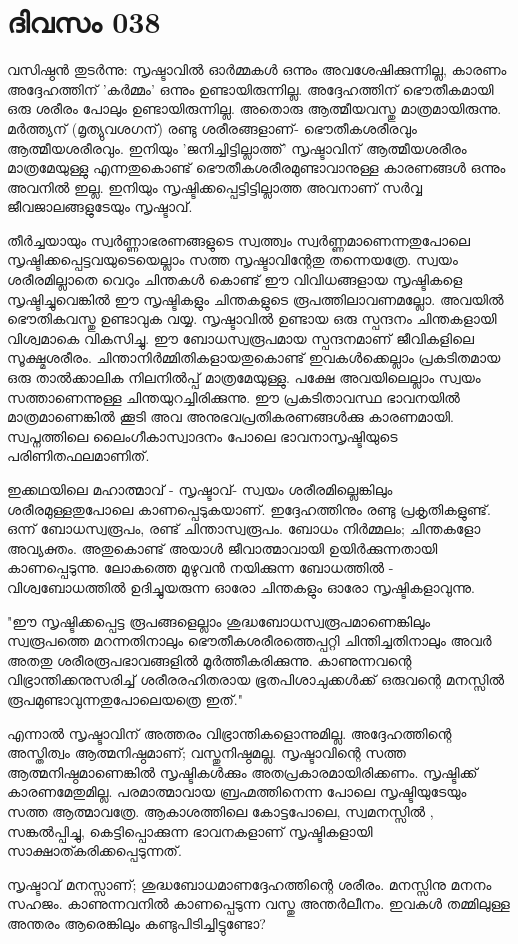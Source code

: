 \newpage
\section{ദിവസം 038}


വസിഷ്ഠന്‍ തുടര്‍ന്നു: സൃഷ്ടാവില്‍ ഓര്‍മ്മകള്‍ ഒന്നും അവശേഷിക്കുന്നില്ല, കാരണം അദ്ദേഹത്തിന്‌ 'കര്‍മ്മം' ഒന്നും ഉണ്ടായിരുന്നില്ല. അദ്ദേഹത്തിന്‌ ഭൌതീകമായി ഒരു ശരീരം പോലും ഉണ്ടായിരുന്നില്ല. അതൊരു ആത്മീയവസ്തു മാത്രമായിരുന്നു. മര്‍ത്ത്യന്‌ (മൃത്യുവശഗന്‌) രണ്ടു ശരീരങ്ങളാണ്‌- ഭൌതീകശരീരവും ആത്മീയശരീരവും. ഇനിയും 'ജനിച്ചിട്ടില്ലാത്ത്‌' സൃഷ്ടാവിന്‌ ആത്മീയശരീരം മാത്രമേയുള്ളു എന്നതുകൊണ്ട്‌ ഭൌതീകശരീരമുണ്ടാവാനുള്ള കാരണങ്ങള്‍ ഒന്നും അവനില്‍ ഇല്ല. ഇനിയും സൃഷ്ടിക്കപ്പെട്ടിട്ടില്ലാത്ത അവനാണ്‌ സര്‍വ്വ ജീവജാലങ്ങളുടേയും സൃഷ്ടാവ്‌. 

തീര്‍ച്ചയായും സ്വര്‍ണ്ണാഭരണങ്ങളുടെ സ്വത്ത്വം സ്വര്‍ണ്ണമാണെന്നതുപോലെ സൃഷ്ടിക്കപ്പെട്ടവയുടെയെല്ലാം സത്ത സൃഷ്ടാവിന്റേതു തന്നെയത്രേ. സ്വയം ശരീരമില്ലാതെ വെറും ചിന്തകള്‍ കൊണ്ട്‌ ഈ വിവിധങ്ങളായ സൃഷ്ടികളെ സൃഷ്ടിച്ചുവെങ്കില്‍ ഈ സൃഷ്ടികളും ചിന്തകളുടെ രൂപത്തിലാവണമല്ലോ. അവയില്‍ ഭൌതികവസ്തു ഉണ്ടാവുക വയ്യ. സൃഷ്ടാവില്‍ ഉണ്ടായ ഒരു സ്പന്ദനം ചിന്തകളായി വിശ്വമാകെ വികസിച്ചു. ഈ ബോധസ്വരൂപമായ സ്പന്ദനമാണ്‌ ജീവികളിലെ സൂക്ഷ്മശരീരം. ചിന്താനിര്‍മ്മിതികളായതുകൊണ്ട്‌ ഇവകള്‍ക്കെല്ലാം പ്രകടിതമായ ഒരു  താല്‍ക്കാലിക നിലനില്‍പ്പ്‌ മാത്രമേയുള്ളു. പക്ഷേ അവയിലെല്ലാം സ്വയം സത്താണെന്നുള്ള ചിന്തയുറച്ചിരിക്കുന്നു. ഈ പ്രകടിതാവസ്ഥ ഭാവനയില്‍ മാത്രമാണെങ്കില്‍ ക്കൂടി അവ അനുഭവപ്രതികരണങ്ങള്‍ക്കു കാരണമായി. സ്വപ്നത്തിലെ ലൈംഗീകാസ്വാദനം പോലെ ഭാവനാസൃഷ്ടിയുടെ പരിണിതഫലമാണിത്‌.

ഇക്കഥയിലെ മഹാത്മാവ്‌ - സൃഷ്ടാവ്‌- സ്വയം ശരീരമില്ലെങ്കിലും ശരീരമുള്ളതുപോലെ കാണപ്പെടുകയാണ്‌. ഇദ്ദേഹത്തിനും രണ്ടു പ്രകൃതികളുണ്ട്‌. ഒന്ന് ബോധസ്വരൂപം, രണ്ട്‌ ചിന്താസ്വരൂപം. ബോധം നിര്‍മ്മലം; ചിന്തകളോ അവ്യക്തം. അതുകൊണ്ട്‌ അയാള്‍ ജീവാത്മാവായി ഉയിര്‍ക്കുന്നതായി കാണപ്പെടുന്നു. ലോകത്തെ മുഴുവന്‍ നയിക്കുന്ന ബോധത്തില്‍ - വിശ്വബോധത്തില്‍ ഉദിച്ചുയരുന്ന ഓരോ ചിന്തകളും ഓരോ സൃഷ്ടികളാവുന്നു.

"ഈ സൃഷ്ടിക്കപ്പെട്ട രൂപങ്ങളെല്ലാം ശുദ്ധബോധസ്വരൂപമാണെങ്കിലും സ്വരൂപത്തെ മറന്നതിനാലും ഭൌതീകശരീരത്തെപ്പറ്റി ചിന്തിച്ചതിനാലും അവര്‍ അതതു ശരീരരൂപഭാവങ്ങളില്‍ മൂര്‍ത്തീകരിക്കുന്നു. കാണുന്നവന്റെ വിഭ്രാന്തിക്കനുസരിച്ച്‌ ശരീരരഹിതരായ ഭൂതപിശാചുക്കള്‍ക്ക്‌ ഒരുവന്റെ മനസ്സില്‍ രൂപമുണ്ടാവുന്നതുപോലെയത്രെ ഇത്‌."

എന്നാല്‍ സൃഷ്ടാവിന്‌ അത്തരം വിഭ്രാന്തികളൊന്നുമില്ല. അദ്ദേഹത്തിന്റെ അസ്തിത്വം ആത്മനിഷ്ഠമാണ്‌; വസ്തുനിഷ്ഠമല്ല. സൃഷ്ടാവിന്റെ സത്ത ആത്മനിഷ്ഠമാണെങ്കില്‍ സൃഷ്ടികള്‍ക്കും അതപ്രകാരമായിരിക്കണം. സൃഷ്ടിക്ക്‌ കാരണമേതുമില്ല. പരമാത്മാവായ ബ്രഹ്മത്തിനെന്ന പോലെ സൃഷ്ടിയുടേയും സത്ത ആത്മാവത്രേ. ആകാശത്തിലെ കോട്ടപോലെ, സ്വമനസ്സില്‍ , സങ്കല്‍പ്പിച്ചു, കെട്ടിപ്പൊക്കുന്ന ഭാവനകളാണ്‌ സൃഷ്ടികളായി സാക്ഷാത്കരിക്കപ്പെടുന്നത്‌. 

സൃഷ്ടാവ്‌ മനസ്സാണ്‌; ശുദ്ധബോധമാണദ്ദേഹത്തിന്റെ ശരീരം. മനസ്സിനു മനനം സഹജം. കാണുന്നവനില്‍ കാണപ്പെടുന്ന വസ്തു അന്തര്‍ലീനം. ഇവകള്‍ തമ്മിലുള്ള അന്തരം ആരെങ്കിലും കണ്ടുപിടിച്ചിട്ടുണ്ടോ?
